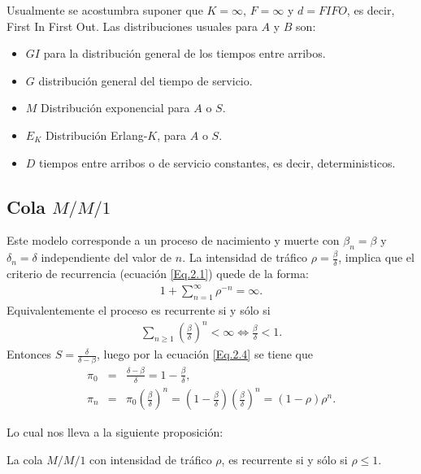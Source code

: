 Usualmente se acostumbra suponer que $K=\infty$, $F=\infty$ y $d=FIFO$, es decir, First In First Out. Las distribuciones usuales para $A$ y $B$ son:

\begin{itemize}
\item $GI$ para la distribuci\'on general de los tiempos entre arribos.
\item $G$ distribuci\'on general del tiempo de servicio.
\item $M$ Distribuci\'on exponencial para $A$ o $S$.
\item $E_{K}$ Distribuci\'on Erlang-$K$, para $A$ o $S$.
\item $D$ tiempos entre arribos o de servicio constantes, es decir, deterministicos.
\end{itemize}


%
\subsection{Cola $M/M/1$}
%
Este modelo corresponde a un proceso de nacimiento y muerte con $\beta_{n}=\beta$ y $\delta_{n}=\delta$ independiente del valor de $n$. La intensidad de tr\'afico $\rho=\frac{\beta}{\delta}$, implica que el criterio de recurrencia (ecuaci\'on \ref{Eq.2.1}) quede de la forma:
\begin{eqnarray*}
1+\sum_{n=1}^{\infty}\rho^{-n}=\infty.
\end{eqnarray*}
Equivalentemente el proceso es recurrente si y s\'olo si
\begin{eqnarray*}
\sum_{n\geq1}\left(\frac{\beta}{\delta}\right)^{n}<\infty\Leftrightarrow \frac{\beta}{\delta}<1.
\end{eqnarray*}
Entonces
$S=\frac{\delta}{\delta-\beta}$, luego por la ecuaci\'on \ref{Eq.2.4} se tiene que
\begin{eqnarray*}
\pi_{0}&=&\frac{\delta-\beta}{\delta}=1-\frac{\beta}{\delta},\\
\pi_{n}&=&\pi_{0}\left(\frac{\beta}{\delta}\right)^{n}=\left(1-\frac{\beta}{\delta}\right)\left(\frac{\beta}{\delta}\right)^{n}=\left(1-\rho\right)\rho^{n}.
\end{eqnarray*}


Lo cual nos lleva a la siguiente proposici\'on:

\begin{Prop}
La cola $M/M/1$ con intensidad de tr\'afico $\rho$, es recurrente si y s\'olo si $\rho\leq1$.
\end{Prop}

